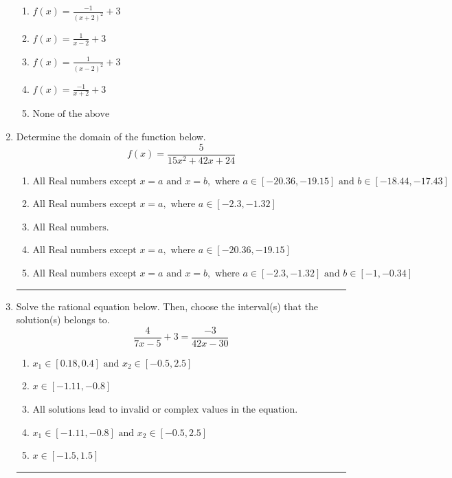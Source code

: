 \documentclass[14pt]{extbook}
\newcommand{\litem}[1]{\item#1\hspace*{-1cm}\rule{\textwidth}{0.4pt}}
\begin{document}
\begin{enumerate}
{\begin{center}
\end{center}
\begin{enumerate}[label=\Alph*.]
\item \( f(x) = \frac{-1}{(x + 2)^2} + 3 \)
\item \( f(x) = \frac{1}{x - 2} + 3 \)
\item \( f(x) = \frac{1}{(x - 2)^2} + 3 \)
\item \( f(x) = \frac{-1}{x + 2} + 3 \)
\item \( \text{None of the above} \)

\end{enumerate} }
\litem{
Determine the domain of the function below.\[ f(x) = \frac{5}{15x^{2} +42 x + 24} \]\begin{enumerate}[label=\Alph*.]
\item \( \text{All Real numbers except } x = a \text{ and } x = b, \text{ where } a \in [-20.36, -19.15] \text{ and } b \in [-18.44, -17.43] \)
\item \( \text{All Real numbers except } x = a, \text{ where } a \in [-2.3, -1.32] \)
\item \( \text{All Real numbers.} \)
\item \( \text{All Real numbers except } x = a, \text{ where } a \in [-20.36, -19.15] \)
\item \( \text{All Real numbers except } x = a \text{ and } x = b, \text{ where } a \in [-2.3, -1.32] \text{ and } b \in [-1, -0.34] \)

\end{enumerate} }
\litem{
Solve the rational equation below. Then, choose the interval(s) that the solution(s) belongs to.\[ \frac{4}{7x -5} + 3 = \frac{-3}{42x -30} \]\begin{enumerate}[label=\Alph*.]
\item \( x_1 \in [0.18, 0.4] \text{ and } x_2 \in [-0.5,2.5] \)
\item \( x \in [-1.11,-0.8] \)
\item \( \text{All solutions lead to invalid or complex values in the equation.} \)
\item \( x_1 \in [-1.11, -0.8] \text{ and } x_2 \in [-0.5,2.5] \)
\item \( x \in [-1.5,1.5] \)


\end{enumerate}}
\end{enumerate}
\end{document}
